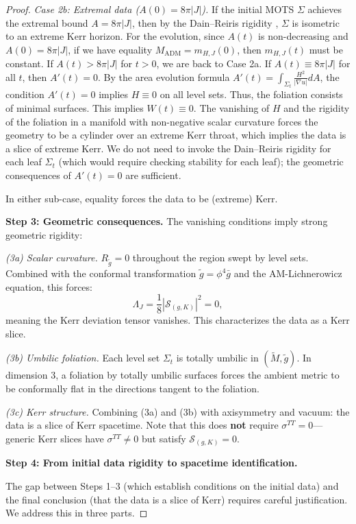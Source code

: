 \documentclass[12pt]{article}
\theoremstyle{plain}
\theoremstyle{definition}
\theoremstyle{remark}
\newcommand{\ADM}{\mathrm{ADM}}
\newcommand{\tM}{\tilde{M}}
\newcommand{\tg}{\tilde{g}}
\newcommand{\bg}{\bar{g}}
\begin{document}
\begin{proof}
\textit{Case 2b: Extremal data ($A(0) = 8\pi|J|$).}
If the initial MOTS $\Sigma$ achieves the extremal bound $A = 8\pi|J|$, then by the Dain--Reiris rigidity \cite{dain2011}, $\Sigma$ is isometric to an extreme Kerr horizon.
For the evolution, since $A(t)$ is non-decreasing and $A(0) = 8\pi|J|$, if we have equality $M_{\ADM} = m_{H,J}(0)$, then $m_{H,J}(t)$ must be constant.
If $A(t) > 8\pi|J|$ for $t > 0$, we are back to Case 2a.
If $A(t) \equiv 8\pi|J|$ for all $t$, then $A'(t) = 0$.
By the area evolution formula $A'(t) = \int_{\Sigma_t} \frac{H^2}{|\nabla u|} dA$, the condition $A'(t) = 0$ implies $H \equiv 0$ on all level sets.
Thus, the foliation consists of minimal surfaces.
This implies $W(t) \equiv 0$.
The vanishing of $H$ and the rigidity of the foliation in a manifold with non-negative scalar curvature forces the geometry to be a cylinder over an extreme Kerr throat, which implies the data is a slice of extreme Kerr.
We do not need to invoke the Dain--Reiris rigidity for each leaf $\Sigma_t$ (which would require checking stability for each leaf); the geometric consequences of $A'(t)=0$ are sufficient.

In either sub-case, equality forces the data to be (extreme) Kerr.

\textbf{Step 3: Geometric consequences.}
The vanishing conditions imply strong geometric rigidity:

\textit{(3a) Scalar curvature.} $R_{\tg} = 0$ throughout the region swept by level sets. Combined with the conformal transformation $\tg = \phi^4 \bg$ and the AM-Lichnerowicz equation, this forces:
\[
\Lambda_J = \frac{1}{8}|\mathcal{S}_{(g,K)}|^2 = 0,
\]
meaning the Kerr deviation tensor vanishes. This characterizes the data as a Kerr slice.

\textit{(3b) Umbilic foliation.} Each level set $\Sigma_t$ is totally umbilic in $(\tM, \tg)$. In dimension 3, a foliation by totally umbilic surfaces forces the ambient metric to be conformally flat in the directions tangent to the foliation.

\textit{(3c) Kerr structure.} Combining (3a) and (3b) with axisymmetry and vacuum: the data is a slice of Kerr spacetime. Note that this does \textbf{not} require $\sigma^{TT} = 0$---generic Kerr slices have $\sigma^{TT} \neq 0$ but satisfy $\mathcal{S}_{(g,K)} = 0$.

\textbf{Step 4: From initial data rigidity to spacetime identification.}

The gap between Steps 1--3 (which establish conditions on the initial data) and the final conclusion (that the data is a slice of Kerr) requires careful justification. We address this in three parts.


\end{proof}
\end{document}

